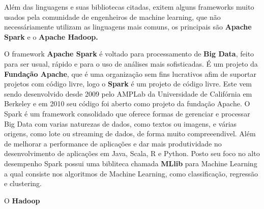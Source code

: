 \begin{figure}[h!]
	\centering
\end{figure}

Além das linguagens e suas bibliotecas citadas, exitem alguns frameworks muito usados pela comunidade de engenheiros de machine learning, 
que não necessáriamente utilizam as linguagens mais comuns, os principais são \textbf{Apache Spark} e o \textbf{Apache Hadoop.}

O framework \textbf{Apache Spark} é voltado para processamento de \textbf{Big Data}, feito para ser usual, rápido e para o uso de análises mais
sofisticadas. É um projeto da \textbf{Fundação Apache}, que é uma organização sem fins lucrativos afim de suportar 
projetos com código livre, logo o \textbf{Spark} é um projeto de código livre. Este vem sendo desenvolvido desde 2009 pelo 
AMPLab da Universidade de Califórnia em Berkeley e em 2010 seu código foi aberto como projeto da fundação Apache. 
O Spark é um framework consolidado que oferece formas de gerenciar e processar Big Data com varias naturezas de dados, como textos ou imagens, e várias origens,  
como lote ou streaming de dados,  de forma muito compreeendivel. Além de melhorar a performance de aplicações e dar mais produtividade no desenvolvimento
de aplicações em Java, Scala, R e Python. Posto seu foco no alto desempenho Spark possui uma bibliteca chamada \textbf{MLlib} para Machine Learning a qual 
consiste nos algoritmos de Machine Learning, como classificação, regressão e clustering.         

O \textbf{Hadoop} 

